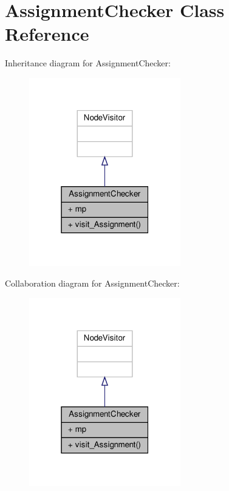 \hypertarget{classVisitors_1_1AssignmentChecker}{}\section{Assignment\+Checker Class Reference}
\label{classVisitors_1_1AssignmentChecker}


Inheritance diagram for Assignment\+Checker\+:\nopagebreak
\begin{figure}[H]
\begin{center}
\leavevmode
\includegraphics[width=187pt]{classVisitors_1_1AssignmentChecker__inherit__graph}
\end{center}
\end{figure}


Collaboration diagram for Assignment\+Checker\+:\nopagebreak
\begin{figure}[H]
\begin{center}
\leavevmode
\includegraphics[width=187pt]{classVisitors_1_1AssignmentChecker__coll__graph}
\end{center}
\end{figure}
